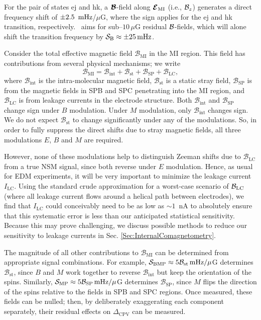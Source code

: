 For the pair of states ej and hk, a $\bm{\mathcal{B}}$-field along $\bm{\mathcal{E}}_\mathrm{MI}$ (i.e., $\mathcal{B}_z$) generates a direct frequency shift of $\pm2.5~\,\mathrm{mHz}$/$\mu$G, where the sign applies for the ej and hk transition, respectively. \CENTREX\ aims for sub--$10\,\mu$G residual $\mathcal{B}$-fields, which will alone shift the transition frequency by $\mathcal{S}_\mathrm{B} \approx \pm 25\,\mathrm{mHz}$.  

Consider the total effective magnetic field $\mathcal{B}_\mathrm{MI}$ in the MI region. This field has contributions from several physical mechanisms; we write
\begin{equation}
    \mathcal{B}_\mathrm{MI} = \mathcal{B}_\mathrm{int} + \mathcal{B}_\mathrm{st} + \mathcal{B}_\mathrm{SP} +
    \mathcal{B}_\mathrm{LC},
\end{equation}
where $\mathcal{B}_\mathrm{int}$ is the intra-molecular magnetic field, $\mathcal{B}_\mathrm{st}$ is a static stray field, $\mathcal{B}_\mathrm{SP}$ is from the magnetic fields in SPB and SPC penetrating into the MI region, and $\mathcal{B}_\mathrm{LC}$ is from leakage currents in the electrode structure.
Both $\mathcal{B}_\mathrm{int}$ and $\mathcal{B}_\mathrm{SP}$ change sign under $B$ modulation. Under $M$ modulation, only $\mathcal{B}_\mathrm{int}$ changes sign. We do not expect $\mathcal{B}_\mathrm{st}$ to change significantly under any of the modulations.
So, in order to fully suppress the direct shifts due to stray magnetic fields, all three modulations $E$, $B$ and $M$ are required.

However, none of these modulations help to distinguish Zeeman shifts due to $\mathcal{B}_\mathrm{LC}$ from a true NSM signal, since both reverse under $E$ modulation.  Hence, as usual for EDM experiments, it will be very important to minimize the leakage current $I_\mathrm{LC}$.  Using the standard crude approximation for a worst-case scenario of $\mathcal{B}_\mathrm{LC}$ (where all leakage current flows around a helical path between electrodes), we find that $I_\mathrm{LC}$ could conceivably need to be as low as $\sim\!1$~nA to absolutely ensure that this systematic error is less than our anticipated statistical sensitivity. Because this may prove challenging, we discuss possible methods to reduce our sensitivity to leakage currents in Sec. \ref{Sec:InternalComagnetometry}.

The magnitude of all other contributions to $\mathcal{B}_\mathrm{MI}$ can be determined from appropriate signal combinations. For example, $\mathcal{S}_\mathrm{BMP} \approx 5\mathcal{B}_\mathrm{st}\,\mathrm{mHz}/\mu$G determines $\mathcal{B}_\mathrm{st}$, since $B$ and $M$ work together to reverse $\mathcal{B}_\mathrm{int}$ but keep the orientation of the spins. Similarly, $\mathcal{S}_\mathrm{MP} \approx 5\mathcal{B}_\mathrm{SP}\,\mathrm{mHz}/\mu$G determines $\mathcal{B}_\mathrm{SP}$,  since $M$ flips the direction of the spins relative to the fields in SPB and SPC regions. Once measured, these fields can be nulled; then, by deliberately exaggerating each component separately, their residual effects on $\Delta_\mathrm{CPV}$ can be measured.

